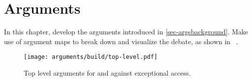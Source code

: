 \chapter{Arguments}
\label{chap-arguments}

In this chapter, develop the arguments introduced in \ref{sec-argsbackground}. Make use of argument maps to break down
and visualize the debate, as shown in \Figure~.

% 
\begin{figure}[h]
    \centering\CaptionFontSize
    \texttt{[image: arguments/build/top-level.pdf]}
    \caption[Argument: Top Level]{Top level arguments for and against exceptional access.}
    \label{fig-args-top-level}
\end{figure}
